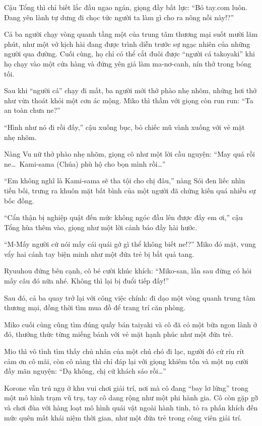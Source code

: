 \documentclass[../main.tex]{subfiles}
\begin{document}
Cậu Tổng thì chỉ biết lắc đầu ngao ngán, giọng đầy bất lực: ``Bó tay.com luôn. Đang yên lành tự dưng đi chọc tức người ta làm gì cho ra nông nỗi này!?''

Cả ba người chạy vòng quanh tầng một của trung tâm thương mại suốt mười lăm phút, như một vở kịch hài đang được trình diễn trước sự ngạc nhiên của những người qua đường. Cuối cùng, họ chỉ có thể cắt đuôi được ``người cá takoyaki'' khi họ chạy vào một cửa hàng và đứng yên giả làm ma-nơ-canh, nín thở trong bóng tối.

Sau khi ``người cá'' chạy đi mất, ba người mới thở phào nhẹ nhõm, những hơi thở như vừa thoát khỏi một cơn ác mộng. Miko thì thầm với giọng còn run run: ``Ta an toàn chưa ne?''

``Hình như nó đi rồi đấy,'' cậu xuống bục, bỏ chiếc mũ vành xuống với vẻ mặt nhẹ nhõm.

Nàng Vu nữ thở phào nhẹ nhõm, giọng cô như một lời cầu nguyện: ``May quá rồi ne\dots\ Kami-sama (Chúa) phù hộ cho bọn mình rồi\dots''

``Em không nghĩ là Kami-sama sẽ tha tội cho chị đâu,'' nàng Sói đen liếc nhìn tiền bối, trưng ra khuôn mặt bất bình của một người đã chứng kiến quá nhiều sự bốc đồng.

``Cẩn thận bị nghiệp quật đến mức không ngóc đầu lên được đấy em ơi,'' cậu Tổng hùa thêm vào, giọng như một lời cảnh báo đầy hài hước.

``M-Mấy người cứ nói mấy cái quái gở gì thể không biết ne!?'' Miko đỏ mặt, vung vẩy hai cánh tay biện minh như một đứa trẻ bị bắt quả tang.

Ryuuhou đứng bên cạnh, cô bé cười khúc khích: ``Miko-san, lần sau đừng có hỏi mấy câu đó nữa nhé. Không thì lại bị đuổi tiếp đấy!''

Sau đó, cả ba quay trở lại với công việc chính: đi dạo một vòng quanh trung tâm thương mại, đồng thời tìm mua đồ để trang trí căn phòng.

Miko cuối cùng cũng tìm đúng quầy bán taiyaki và cô đã có một bữa ngon lành ở đó, thưởng thức từng miếng bánh với vẻ mặt hạnh phúc như một đứa trẻ.

Mio thì vô tình tìm thấy chủ nhân của một chú chó đi lạc, người đó cứ ríu rít cảm ơn cô mãi, còn cô nàng thì chỉ đáp lại với giọng khiêm tốn và một nụ cười đầy mãn nguyện: ``Dạ không, chị cứ khách sáo rồi\dots''

Korone vẫn trú ngụ ở khu vui chơi giải trí, nơi mà cô đang ``bay lơ lửng'' trong một mô hình trạm vũ trụ, tay cô dang rộng như một phi hành gia. Cô còn gặp gỡ và chơi đùa với hàng loạt mô hình quái vật ngoài hành tinh, tỏ ra phấn khích đến mức quên mất khái niệm thời gian, như một đứa trẻ trong công viên giải trí.
\end{document}
